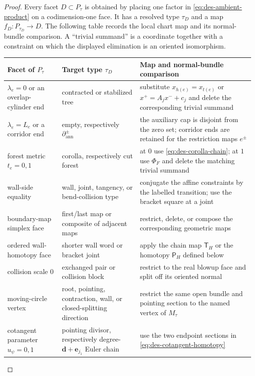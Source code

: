 \begin{proof}
Every facet $D\subset P_\tau$ is obtained by placing one factor in
\eqref{eq:des-ambient-product} on a codimension-one face.  It has a resolved
type $\tau_D$ and a map $f_D:P_{\tau_D}\to D$.  The following table records
the local chart map and its normal-bundle comparison.  A ``trivial summand''
is a coordinate together with a constraint on which the displayed
elimination is an oriented isomorphism.
\begin{center}
\begin{tabularx}{\textwidth}{@{}
 >{\raggedright\arraybackslash}p{}
 >{\raggedright\arraybackslash}p{}
 >{\raggedright\arraybackslash}X@{}}
\toprule
Facet of $P_\tau$ & Target type $\tau_D$ & Map and normal-bundle comparison\\
\midrule
$\lambda_e=0$ or an overlap-cylinder end & contracted or stabilized tree & substitute $x_{h(e)}=x_{t(e)}$ or $x^+=A_jx^-+c_j$ and delete the corresponding trivial summand\\
$\lambda_e=L_e$ or a corridor end & empty, respectively $\partial_{\mathrm{ann}}^\pm$ & the auxiliary cap is disjoint from the zero set; corridor ends are retained for the restriction maps $e^\pm$\\
forest metric $t_e=0,1$ & corolla, respectively cut forest & at $0$ use \eqref{eq:des-corolla-chain}; at $1$ use $\Phi_F$ and delete the matching trivial summand\\
wall-side equality & wall, joint, tangency, or bend-collision type & conjugate the affine constraints by the labelled transition; use the bracket square at a joint\\
boundary-map simplex face & first/last map or composite of adjacent maps & restrict, delete, or compose the corresponding geometric maps\\
ordered wall-homotopy face & shorter wall word or bracket joint & apply the chain map $\mathsf T_H$ or the homotopy $\mathsf P_H$ defined below\\
collision scale $0$ & exchanged pair or collision block & restrict to the real blowup face and split off its oriented normal\\
moving-circle vertex & root, pointing, contraction, wall, or closed-splitting direction & restrict the same open bundle and pointing section to the named vertex of $M_\tau$\\
cotangent parameter $u_\psi=0,1$ & pointing divisor, respectively degree-$\mathbf d+\mathbf e_{j_1}$ Euler chain & use the two endpoint sections in \eqref{eq:des-cotangent-homotopy}\\

\end{tabularx}
\end{center}
\end{proof}
